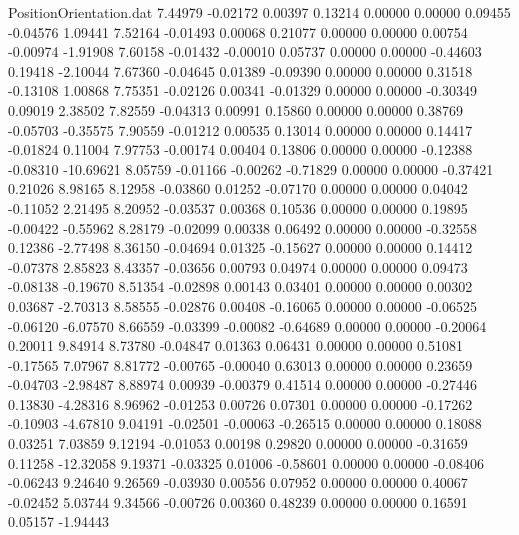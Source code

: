 \begin{filecontents}{PositionOrientation.dat}
   7.44979   -0.02172    0.00397     0.13214    0.00000    0.00000    0.09455   -0.04576    1.09441
   7.52164   -0.01493    0.00068     0.21077    0.00000    0.00000    0.00754   -0.00974   -1.91908
   7.60158   -0.01432   -0.00010     0.05737    0.00000    0.00000   -0.44603    0.19418   -2.10044
   7.67360   -0.04645    0.01389    -0.09390    0.00000    0.00000    0.31518   -0.13108    1.00868
   7.75351   -0.02126    0.00341    -0.01329    0.00000    0.00000   -0.30349    0.09019    2.38502
   7.82559   -0.04313    0.00991     0.15860    0.00000    0.00000    0.38769   -0.05703   -0.35575
   7.90559   -0.01212    0.00535     0.13014    0.00000    0.00000    0.14417   -0.01824    0.11004
   7.97753   -0.00174    0.00404     0.13806    0.00000    0.00000   -0.12388   -0.08310  -10.69621
   8.05759   -0.01166   -0.00262    -0.71829    0.00000    0.00000   -0.37421    0.21026    8.98165
   8.12958   -0.03860    0.01252    -0.07170    0.00000    0.00000    0.04042   -0.11052    2.21495
   8.20952   -0.03537    0.00368     0.10536    0.00000    0.00000    0.19895   -0.00422   -0.55962
   8.28179   -0.02099    0.00338     0.06492    0.00000    0.00000   -0.32558    0.12386   -2.77498
   8.36150   -0.04694    0.01325    -0.15627    0.00000    0.00000    0.14412   -0.07378    2.85823
   8.43357   -0.03656    0.00793     0.04974    0.00000    0.00000    0.09473   -0.08138   -0.19670
   8.51354   -0.02898    0.00143     0.03401    0.00000    0.00000    0.00302    0.03687   -2.70313
   8.58555   -0.02876    0.00408    -0.16065    0.00000    0.00000   -0.06525   -0.06120   -6.07570
   8.66559   -0.03399   -0.00082    -0.64689    0.00000    0.00000   -0.20064    0.20011    9.84914
   8.73780   -0.04847    0.01363     0.06431    0.00000    0.00000    0.51081   -0.17565    7.07967
   8.81772   -0.00765   -0.00040     0.63013    0.00000    0.00000    0.23659   -0.04703   -2.98487
   8.88974    0.00939   -0.00379     0.41514    0.00000    0.00000   -0.27446    0.13830   -4.28316
   8.96962   -0.01253    0.00726     0.07301    0.00000    0.00000   -0.17262   -0.10903   -4.67810
   9.04191   -0.02501   -0.00063    -0.26515    0.00000    0.00000    0.18088    0.03251    7.03859
   9.12194   -0.01053    0.00198     0.29820    0.00000    0.00000   -0.31659    0.11258  -12.32058
   9.19371   -0.03325    0.01006    -0.58601    0.00000    0.00000   -0.08406   -0.06243    9.24640
   9.26569   -0.03930    0.00556     0.07952    0.00000    0.00000    0.40067   -0.02452    5.03744
   9.34566   -0.00726    0.00360     0.48239    0.00000    0.00000    0.16591    0.05157   -1.94443

\end{filecontents}
